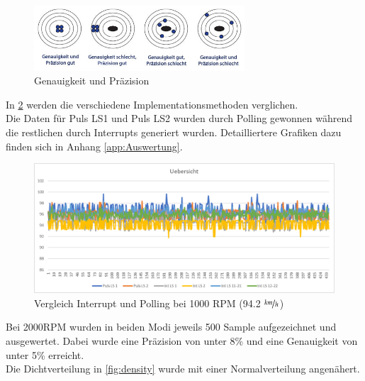 \begin{figure}[ht]
    \centering
    \includegraphics[width=0.7\textwidth]{images/testingtips}
    \caption{Genauigkeit und Präzision}
    \label{fig:GenauPraz}
\end{figure}
\clearpage

In \ref{fig:AuswertungInt}  werden die verschiedene Implementationsmethoden verglichen.\\

Die Daten für Puls LS1 und Puls LS2 wurden durch Polling gewonnen während die restlichen durch Interrupts generiert wurden. Detailliertere Grafiken dazu finden sich in Anhang \ref{app:Auswertung}.
\begin{figure}[ht]
    \centering
    	\includegraphics[width=\textwidth]{images/auswertungInt.png}
    \caption{Vergleich Interrupt und Polling bei 1000 RPM (94.2 $\nicefrac{km}{h}$)}
    \label{fig:AuswertungInt}
\end{figure}


Bei 2000RPM wurden in beiden Modi jeweils 500 Sample aufgezeichnet und ausgewertet. Dabei wurde eine Präzision von unter 8\% und eine Genauigkeit von unter 5\% erreicht.\\
Die Dichtverteilung in \ref{fig:density} wurde mit einer Normalverteilung angenähert.


